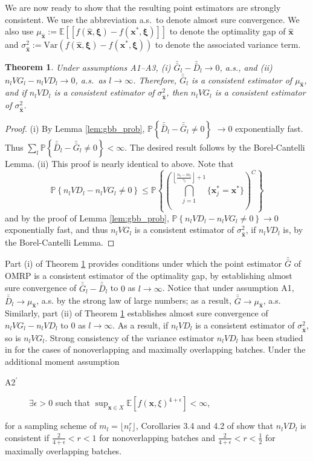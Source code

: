 \documentclass[12pt]{article}
\newtheorem{theorem}{Theorem}
\newcommand{\p}[1]{\mathbb{P} \left\{ #1 \right\}}
\newcommand{\e}[1]{\mathbb{E} \left[ #1 \right]
}
\newcommand{\var}[1]{\mathrm{Var} \left( #1 \right)}
\newcommand{\x}{\mathbf{x}}
\newcommand{\xh}{{\hat{\x}}}
\newcommand{\xs}{\x^*}
\newcommand{\xit}{\boldsymbol{\xi}}
\newcommand{\nbl}{\left\lfloor\tfrac{n_l-m_l}{\gamma_l}\right\rfloor+1}
\newcommand{\gb}{\bar{G}}
\newcommand{\gbb}{\bar{\gb}}
\newcommand{\db}{\bar{D}}
\newcommand{\dbb}{\bar{\db}}
\begin{document}
We are now ready to show that the resulting point estimators are strongly consistent. 
We use the abbreviation a.s.\ to denote almost sure convergence. 
We also use $\mu_{\xh} := \e{\left[f(\xh,\xit) - f(\xs,\xit)\right]}$ to denote the optimality gap of $\xh$ and $\sigma^2_{\xh} := \var{f(\xh,\xit) - f(\xs,\xit)}$ to denote the associated variance term. 

\begin{theorem} \label{thm:strong_consistency}
	Under assumptions A1--A3, (i) $\gbb_l - \dbb_l \rightarrow 0$, a.s., and (ii) $n_l VG_l - n_l VD_l \rightarrow 0$, a.s.\ as $l \rightarrow \infty$.  
        Therefore, $\gbb_l$ is a consistent estimator of $\mu_{\xh}$, and if $n_l VD_l$ is a consistent estimator of $\sigma^2_{\xh}$, then $n_l VG_l$ is a consistent estimator of $\sigma^2_{\xh}$.
\end{theorem}

\begin{proof}
	(i) By Lemma \ref{lem:gbb_prob}, $\p{\dbb_l - \gbb_l \neq 0}$ $\rightarrow 0$ exponentially fast.  
        Thus $\sum_l \p{\dbb_l - \gbb_l \neq 0} < \infty$.  
        The desired result follows by the Borel-Cantelli Lemma.
%
(ii) This proof is nearly identical to above.  
Note that
	\[
		\p{n_l VD_l -n_l VG_l \neq 0} \leq \p{\left( \bigcap_{j=1}^{\nbl} \{\xs_{j} = \xs\} \right)^C}
	\]
	and by the proof of Lemma \ref{lem:gbb_prob}, $\p{n_l VD_l -n_l VG_l \neq 0} \rightarrow 0$ exponentially fast, and thus $n_l VG_l$ is a consistent estimator of $\sigma^2_{\xh}$, if $n_l VD_l$ is, by the Borel-Cantelli Lemma.
\end{proof}

Part (i) of Theorem \ref{thm:strong_consistency} provides conditions under which the point estimator $\gbb$ of OMRP is a consistent estimator of the optimality gap, by establishing almost sure convergence of $\gbb_l - \dbb_l$ to $0$ as $l \rightarrow \infty$. 
Notice that under assumption A1, $\dbb_l \rightarrow \mu_\xh$, a.s. by the strong law of large numbers; as a result, $\gbb \rightarrow \mu_\xh$, a.s. 
Similarly, part (ii) of Theorem \ref{thm:strong_consistency} establishes almost sure convergence of $n_l VG_l - n_l VD_l$ to $0$ as $l \rightarrow \infty$. 
As a result, if $n_l VD_l$ is a consistent estimator of $\sigma^2_{\xh}$, so is $n_l VG_l$.  
Strong consistency of the variance estimator $n_l VD_l$ has been studied in \citep{damerdji1994strong} for the cases of nonoverlapping and maximally overlapping batches.  
Under the additional moment assumption
\begin{description}
	\item[A2$^\prime$]  $\exists \epsilon > 0$ such that $\sup_{\x \in X} \e{f(\x,\xi)^{4+\epsilon}} < \infty$,
\end{description}
for a sampling scheme of $m_l = \lfloor n_l^r \rfloor$, Corollaries 3.4 and 4.2 of \citep{damerdji1994strong} show that $n_l VD_l$ is consistent if $\tfrac{2}{4+\epsilon} < r < 1$ for nonoverlapping batches and $\tfrac{2}{4+\epsilon} < r < \tfrac{1}{2}$ for maximally overlapping batches. 
\end{document}
